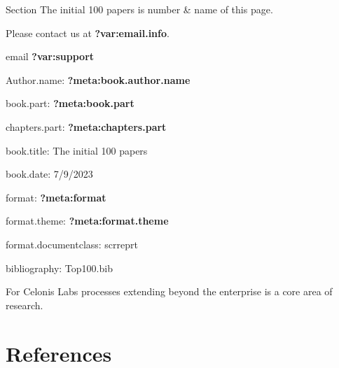 \documentclass[
  letterpaper,
  DIV=11,
  numbers=noendperiod]{scrreprt}
\begin{document}
Section The initial 100 papers is number \& name of this page.

Please contact us at \textbf{?var:email.info}.

email \textbf{?var:support}

Author.name: \textbf{?meta:book.author.name}

book.part: \textbf{?meta:book.part}

chapters.part: \textbf{?meta:chapters.part}

book.title: The initial 100 papers

book.date: 7/9/2023

format: \textbf{?meta:format}

format.theme: \textbf{?meta:format.theme}

format.documentclass: scrreprt

bibliography: Top100.bib

For Celonis Labs processes extending beyond the enterprise is a core
area of research.


\hypertarget{references}{%
\chapter*{References}\label{references}}

\end{document}
